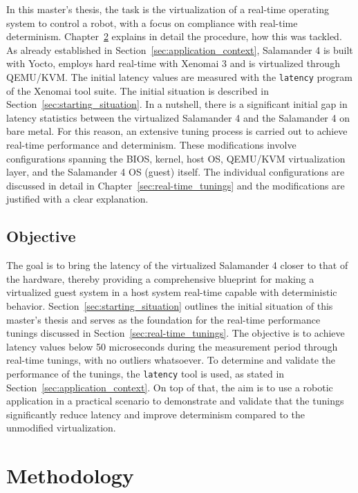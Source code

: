\documentclass[MMR,Master,english]{twbook}
\begin{document}
\clearpage

\bigskip \noindent In this master's thesis, the task is the virtualization of a real-time operating system to control a robot, with a focus on compliance with real-time determinism. Chapter~\ref{cha:methodology} explains in detail the procedure, how this was tackled.  As already established in Section~\ref{sec:application_context}, Salamander 4 is built with Yocto, employs hard real-time with Xenomai 3 and is virtualized through QEMU/KVM. The initial latency values are measured with the \texttt{latency} program of the Xenomai tool suite. The initial situation is described in Section~\ref{sec:starting_situation}. In a nutshell, there is a significant initial gap in latency statistics between the virtualized Salamander 4 and the Salamander 4 on bare metal. For this reason, an extensive tuning process is carried out to achieve real-time performance and determinism. These modifications involve configurations spanning the BIOS, kernel, host OS, QEMU/KVM virtualization layer, and the Salamander 4 OS (guest) itself. The individual configurations are discussed in detail in Chapter~\ref{sec:real-time_tunings} and the modifications are justified with a clear explanation.

\section{Objective}
The goal is to bring the latency of the virtualized Salamander 4 closer to that of the hardware, thereby providing a comprehensive blueprint for making a virtualized guest system in a host system real-time capable with deterministic behavior. Section~\ref{sec:starting_situation} outlines the initial situation of this master's thesis and serves as the foundation for the real-time performance tunings discussed in Section~\ref{sec:real-time_tunings}. The objective is to achieve latency values below 50 microseconds during the measurement period through real-time tunings, with no outliers whatsoever. To determine and validate the performance of the tunings, the \texttt{latency} tool is used, as stated in Section~\ref{sec:application_context}. On top of that, the aim is to use a robotic application in a practical scenario to demonstrate and validate that the tunings significantly reduce latency and improve determinism compared to the unmodified virtualization.

\clearpage

\chapter{Methodology}\label{cha:methodology}
\end{document}
